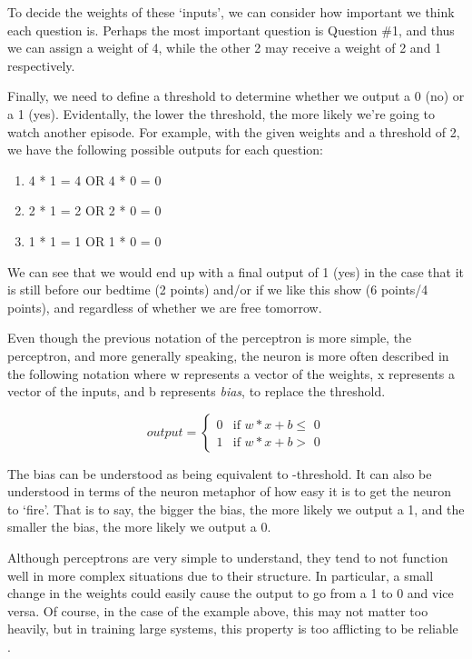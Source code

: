 \documentclass
[
    a4paper,
    twoside,
    12pt,
]
{report}
\begin{document}
To decide the weights of these `inputs', we can consider how important
we think each question is. Perhaps the most important question is
Question \#1, and thus we can assign a weight of 4, while the other 2
may receive a weight of 2 and 1 respectively.

Finally, we need to define a threshold to determine whether we output a
0 (no) or a 1 (yes). Evidentally, the lower the threshold, the more
likely we're going to watch another episode. For example, with the given
weights and a threshold of 2, we have the following possible outputs for
each question:

\begin{enumerate}
\def\labelenumi{\arabic{enumi}.}
\tightlist
\item
  4 * 1 = 4 OR 4 * 0 = 0
\item
  2 * 1 = 2 OR 2 * 0 = 0
\item
  1 * 1 = 1 OR 1 * 0 = 0
\end{enumerate}

We can see that we would end up with a final output of 1 (yes) in the
case that it is still before our bedtime (2 points) and/or if we like
this show (6 points/4 points), and regardless of whether we are free
tomorrow.

Even though the previous notation of the perceptron is more simple, the
perceptron, and more generally speaking, the neuron is more often
described in the following notation where w represents a vector of the
weights, x represents a vector of the inputs, and b represents
\emph{bias}, to replace the threshold.

\begin{equation*}
    output=\begin{cases}
        0 & \text{if $w * x + b \leq$ 0} \\
        1 & \text{if $w * x + b >$ 0}
    \end{cases}
\end{equation*}

The bias can be understood as being equivalent to -threshold. It can
also be understood in terms of the neuron metaphor of how easy it is to
get the neuron to `fire'. That is to say, the bigger the bias, the more
likely we output a 1, and the smaller the bias, the more likely we
output a 0.

Although perceptrons are very simple to understand, they tend to not
function well in more complex situations due to their structure. In
particular, a small change in the weights could easily cause the output
to go from a 1 to 0 and vice versa. Of course, in the case of the
example above, this may not matter too heavily, but in training large
systems, this property is too afflicting to be reliable
\parencite{nielsen2015}.
\end{document}
